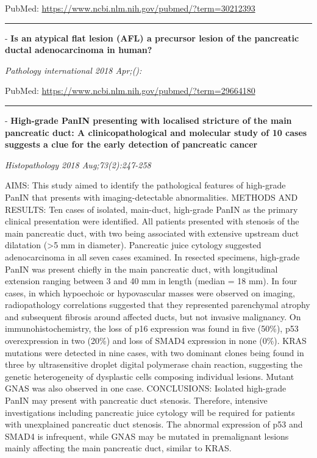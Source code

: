 \documentclass[]{article}
\begin{document}
PubMed: \url{https://www.ncbi.nlm.nih.gov/pubmed/?term=30212393}

{}

{}

\begin{center}\rule{0.5\linewidth}{\linethickness}\end{center}

 - \textbf{Is an atypical flat lesion (AFL) a precursor lesion of the
pancreatic ductal adenocarcinoma in human?}

\emph{Pathology international 2018 Apr;():}

PubMed: \url{https://www.ncbi.nlm.nih.gov/pubmed/?term=29664180}

{}

{}

\begin{center}\rule{0.5\linewidth}{\linethickness}\end{center}

 - \textbf{High-grade PanIN presenting with localised stricture of the
main pancreatic duct: A clinicopathological and molecular study of 10
cases suggests a clue for the early detection of pancreatic cancer}

\emph{Histopathology 2018 Aug;73(2):247-258}

AIMS: This study aimed to identify the pathological features of
high-grade PanIN that presents with imaging-detectable abnormalities.
METHODS AND RESULTS: Ten cases of isolated, main-duct, high-grade PanIN
as the primary clinical presentation were identified. All patients
presented with stenosis of the main pancreatic duct, with two being
associated with extensive upstream duct dilatation (\textgreater{}5 mm
in diameter). Pancreatic juice cytology suggested adenocarcinoma in all
seven cases examined. In resected specimens, high-grade PanIN was
present chiefly in the main pancreatic duct, with longitudinal extension
ranging between 3 and 40 mm in length (median = 18 mm). In four cases,
in which hypoechoic or hypovascular masses were observed on imaging,
radiopathology correlations suggested that they represented parenchymal
atrophy and subsequent fibrosis around affected ducts, but not invasive
malignancy. On immunohistochemistry, the loss of p16 expression was
found in five (50\%), p53 overexpression in two (20\%) and loss of SMAD4
expression in none (0\%). KRAS mutations were detected in nine cases,
with two dominant clones being found in three by ultrasensitive droplet
digital polymerase chain reaction, suggesting the genetic heterogeneity
of dysplastic cells composing individual lesions. Mutant GNAS was also
observed in one case. CONCLUSIONS: Isolated high-grade PanIN may present
with pancreatic duct stenosis. Therefore, intensive investigations
including pancreatic juice cytology will be required for patients with
unexplained pancreatic duct stenosis. The abnormal expression of p53 and
SMAD4 is infrequent, while GNAS may be mutated in premalignant lesions
mainly affecting the main pancreatic duct, similar to KRAS.
\end{document}
